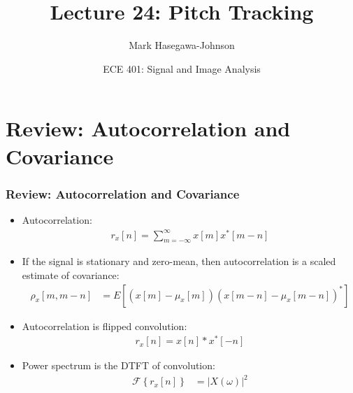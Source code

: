 \documentclass{beamer}
\title{Lecture 24: Pitch Tracking}
\author{Mark Hasegawa-Johnson}
\date{ECE 401: Signal and Image Analysis}
\begin{document}
\begin{frame}
  \maketitle
\end{frame}

\begin{frame}
  \tableofcontents
\end{frame}

\section[Review]{Review: Autocorrelation and Covariance}

\begin{frame}
  \frametitle{Review: Autocorrelation and Covariance}

  \begin{itemize}
  \item Autocorrelation:
    \begin{align*}
      r_x[n] = \sum_{m=-\infty}^\infty x[m]x^*[m-n]
    \end{align*}
  \item If the signal is stationary and zero-mean, then autocorrelation
    is a scaled estimate of covariance:
    \begin{align*}
      \rho_x[m,m-n] &=E\left[(x[m]-\mu_x[m])(x[m-n]-\mu_x[m-n])^*\right]
    \end{align*}
  \item Autocorrelation is flipped convolution:
    \begin{align*}
      r_x[n] = x[n]\ast x^*[-n]
    \end{align*}
  \item Power spectrum is the DTFT of convolution:
    \begin{align*}
      \mathcal{F}\left\{r_x[n]\right\}
      &=|X(\omega)|^2
    \end{align*}
  \end{itemize}
\end{frame}
    
\end{document}
